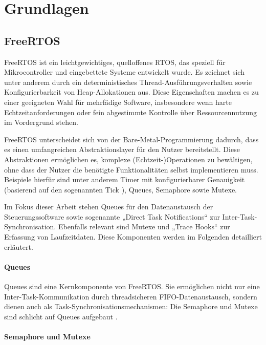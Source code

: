 \section{Grundlagen}

\subsection{FreeRTOS}

FreeRTOS ist ein leichtgewichtiges, quelloffenes RTOS, das speziell für
Mikrocontroller und eingebettete Systeme entwickelt wurde. Es zeichnet sich
unter anderem durch ein deterministisches Thread-Ausführungsverhalten sowie
Konfigurierbarkeit von Heap-Allokationen aus. Diese Eigenschaften machen es zu
einer geeigneten Wahl für mehrfädige Software, insbesondere wenn harte
Echtzeitanforderungen \cite{freertos_tutorial} oder fein abgestimmte Kontrolle
über Ressourcennutzung im Vordergrund stehen.

FreeRTOS unterscheidet sich von der Bare-Metal-Programmierung dadurch, dass es
einen umfangreichen Abstraktionslayer für den Nutzer bereitstellt. Diese
Abstraktionen ermöglichen es, komplexe (Echtzeit-)Operationen zu bewältigen,
ohne dass der Nutzer die benötigte Funktionalitäten selbst implementieren muss.
Beispiele hierfür sind unter anderem Timer mit konfigurierbarer Genauigkeit
(basierend auf den sogenannten Tick \cite{freertos_rtos_tick}), Queues,
Semaphore sowie Mutexe.

Im Fokus dieser Arbeit stehen Queues für den Datenaustausch der
Steuerungssoftware sowie sogenannte „Direct Task Notifications“ zur
Inter-Task-Synchronisation. Ebenfalls relevant sind Mutexe und „Trace Hooks“ zur
Erfassung von Laufzeitdaten. Diese Komponenten werden im Folgenden detailliert
erläutert.

\paragraph{Queues}

Queues sind eine Kernkomponente von FreeRTOS. Sie ermöglichen nicht nur eine
Inter-Task-Kommunikation durch threadsicheren FIFO-Datenaustausch, sondern
dienen auch als Task-Synchronisationsmechanismen: Die Semaphore und Mutexe sind
schlicht auf Queues aufgebaut \cite{freertos_semphr_incl, freertos_queue_mtx}.

\paragraph{Semaphore und Mutexe} \label{sec:mutex}

